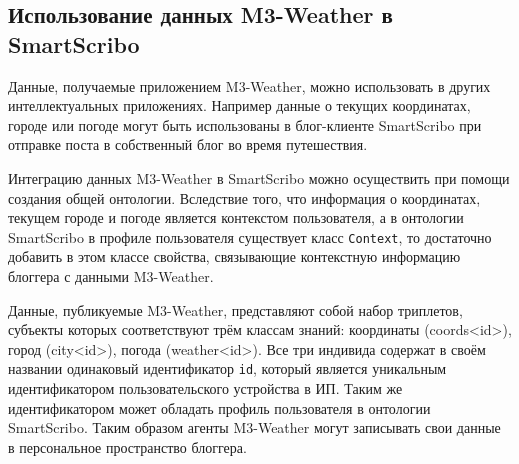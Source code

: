 \subsection*{Использование данных M3-Weather в SmartScribo}

Данные, получаемые приложением M3-Weather, можно использовать в других интеллектуальных приложениях. Например данные о текущих координатах, городе или погоде могут быть использованы в блог-клиенте SmartScribo при отправке поста в собственный блог во время путешествия.

Интеграцию данных M3-Weather в SmartScribo можно осуществить при помощи создания общей онтологии. Вследствие того, что информация о координатах, текущем городе и погоде является контекстом пользователя, а в онтологии SmartScribo в профиле пользователя существует класс {\tt Context}, то достаточно добавить в этом классе свойства, связывающие контекстную информацию блоггера с данными M3-Weather.

Данные, публикуемые M3-Weather, представляют собой набор триплетов, субъекты которых соответствуют трём классам знаний: координаты (coords<id>), город (city<id>), погода (weather<id>). Все три индивида содержат в своём названии одинаковый идентификатор {\tt id}, который является уникальным идентификатором пользовательского устройства в ИП. Таким же идентификатором может обладать профиль пользователя в онтологии SmartScribo. Таким образом агенты M3-Weather могут записывать свои данные в персональное пространство блоггера.

